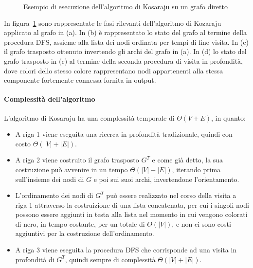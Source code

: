 \begin{figure}
    \resizebox{!}{4cm}{
        }
    \resizebox{!}{4cm}{
        }
    \caption{Esempio di esecuzione dell'algoritmo di Kosaraju su un grafo diretto}
    \label{fig:kozaraju_example}
\end{figure}

In figura~\ref{fig:kozaraju_example} sono rappresentate le fasi rilevanti dell'algoritmo di Kozaraju
applicato al grafo in (a).
In (b) \`e rappresentato lo stato del grafo al termine della procedura DFS, assieme alla lista dei nodi ordinata
per tempi di fine visita.
In (c) il grafo trasposto ottenuto invertendo gli archi del grafo in (a).
In (d) lo stato del grafo trasposto in (c) al termine della seconda procedura di visita in
profondit\`a, dove colori dello stesso colore rappresentano nodi appartenenti alla stessa componente fortemente
connessa fornita in output.

\paragraph{Complessit\`a dell'algoritmo}
L'algoritmo di Kosaraju ha una complessit\`a temporale di $\Theta(V + E)$, in quanto:
\begin{itemize}
    \item A riga 1 viene eseguita una ricerca in profondit\`a tradizionale, quindi con costo $\Theta(|V| + |E|)$.
    \item A riga 2 viene costruito il grafo trasposto $G^T$ e come gi\`a detto, la sua costruzione pu\`o avvenire in
    un tempo $\Theta(|V| + |E|)$, iterando prima sull'insieme dei nodi di $G$ e poi sui suoi archi, invertendone
    l'orientamento.
    \item L'ordinamento dei nodi di $G^T$ pu\`o essere realizzato nel corso della visita a riga 1 attraverso la
    costruizione di una lista concatenata, per cui i singoli nodi possono essere aggiunti in testa alla lista nel
    momento in cui vengono colorati di nero, in tempo costante, per un totale di $\Theta(|V|)$, e non ci sono costi
    aggiuntivi per la costruzione dell'ordinamento.
    \item A riga 3 viene eseguita la procedura DFS che corrisponde ad una visita in profondit\`a di $G^T$, quindi
    sempre di complessit\`a $\Theta(|V| + |E|)$.
\end{itemize}
